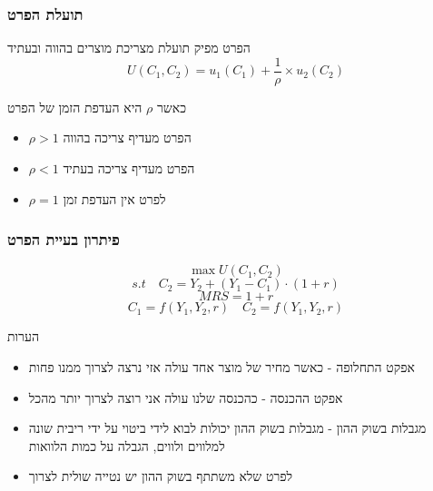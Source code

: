 \documentclass[usenames,dvipsnames]{beamer}
\begin{document}
\begin{RTL}
    


\begin{frame}
    \frametitle{תועלת הפרט}
    הפרט מפיק תועלת מצריכת מוצרים בהווה ובעתיד
    \begin{equation*}
        U(C_1,C_2) = u_1(C_1) + \frac{1}{\rho} \times u_2(C_2)
    \end{equation*}

    כאשר $\rho$ היא העדפת הזמן של הפרט
    \begin{itemize}
        \item $\rho > 1$ הפרט מעדיף צריכה בהווה
        \item $\rho < 1$ הפרט מעדיף צריכה בעתיד
        \item $\rho = 1$ לפרט אין העדפת זמן
    \end{itemize}    

\end{frame}

\begin{frame}
    \frametitle{פיתרון בעיית הפרט}
    \begin{equation}
        \max U(C_1,C_2) 
    \end{equation}
    \begin{equation}
        s.t \quad C_2 = Y_2 + (Y_1 - C_1) \cdot (1+r)
    \end{equation}
    \begin{equation}
        MRS = 1+r
    \end{equation}
    \begin{equation}
        C_1 = f\left(Y_1,Y_2,r\right)  \quad C_2 = f\left(Y_1,Y_2,r\right)
    \end{equation}
\end{frame}

\begin{frame}{הערות}
    \begin{itemize}
        \item אפקט התחלופה - כאשר מחיר של מוצר אחד עולה אזי נרצה לצרוך ממנו פחות
        \item אפקט ההכנסה - כהכנסה שלנו עולה אני רוצה לצרוך יותר מהכל
        \item מגבלות בשוק ההון - מגבלות בשוק ההון יכולות לבוא לידי ביטוי על ידי ריבית שונה למלווים ולווים, הגבלה על כמות הלוואות
        \item לפרט שלא משתתף בשוק ההון יש נטייה שולית לצרוך
    \end{itemize}
    
    
\end{frame}
\end{RTL}
\end{document}
